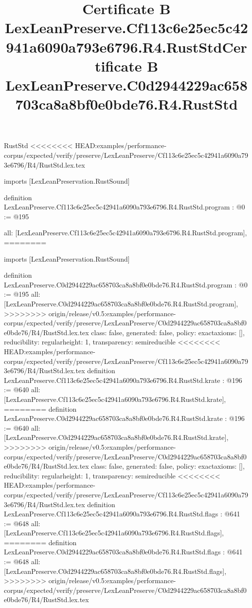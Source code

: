 \begin{lexlean}{RustStd}
<<<<<<<< HEAD:examples/performance-corpus/expected/verify/preserve/LexLeanPreserve/Cf113c6e25ec5c42941a6090a793e6796/R4/RustStd.lex.tex
\title{Certificate B LexLeanPreserve.Cf113c6e25ec5c42941a6090a793e6796.R4.RustStd}
\begin{coremodule}
imports [LexLeanPreservation.RustSound]

definition LexLeanPreserve.Cf113c6e25ec5c42941a6090a793e6796.R4.RustStd.program : @0 := @195 {
  all: [LexLeanPreserve.Cf113c6e25ec5c42941a6090a793e6796.R4.RustStd.program],
========
\title{Certificate B LexLeanPreserve.C0d2944229ac658703ca8a8bf0e0bde76.R4.RustStd}
\begin{coremodule}
imports [LexLeanPreservation.RustSound]

definition LexLeanPreserve.C0d2944229ac658703ca8a8bf0e0bde76.R4.RustStd.program : @0 := @195 {
  all: [LexLeanPreserve.C0d2944229ac658703ca8a8bf0e0bde76.R4.RustStd.program],
>>>>>>>> origin/release/v0.5:examples/performance-corpus/expected/verify/preserve/LexLeanPreserve/C0d2944229ac658703ca8a8bf0e0bde76/R4/RustStd.lex.tex
  class: false,
  generated: false,
  policy: exact{axioms: []},
  reducibility: regular{height: 1},
  transparency: semireducible
}
<<<<<<<< HEAD:examples/performance-corpus/expected/verify/preserve/LexLeanPreserve/Cf113c6e25ec5c42941a6090a793e6796/R4/RustStd.lex.tex
definition LexLeanPreserve.Cf113c6e25ec5c42941a6090a793e6796.R4.RustStd.krate : @196 := @640 {
  all: [LexLeanPreserve.Cf113c6e25ec5c42941a6090a793e6796.R4.RustStd.krate],
========
definition LexLeanPreserve.C0d2944229ac658703ca8a8bf0e0bde76.R4.RustStd.krate : @196 := @640 {
  all: [LexLeanPreserve.C0d2944229ac658703ca8a8bf0e0bde76.R4.RustStd.krate],
>>>>>>>> origin/release/v0.5:examples/performance-corpus/expected/verify/preserve/LexLeanPreserve/C0d2944229ac658703ca8a8bf0e0bde76/R4/RustStd.lex.tex
  class: false,
  generated: false,
  policy: exact{axioms: []},
  reducibility: regular{height: 1},
  transparency: semireducible
}
<<<<<<<< HEAD:examples/performance-corpus/expected/verify/preserve/LexLeanPreserve/Cf113c6e25ec5c42941a6090a793e6796/R4/RustStd.lex.tex
definition LexLeanPreserve.Cf113c6e25ec5c42941a6090a793e6796.R4.RustStd.flags : @641 := @648 {
  all: [LexLeanPreserve.Cf113c6e25ec5c42941a6090a793e6796.R4.RustStd.flags],
========
definition LexLeanPreserve.C0d2944229ac658703ca8a8bf0e0bde76.R4.RustStd.flags : @641 := @648 {
  all: [LexLeanPreserve.C0d2944229ac658703ca8a8bf0e0bde76.R4.RustStd.flags],
>>>>>>>> origin/release/v0.5:examples/performance-corpus/expected/verify/preserve/LexLeanPreserve/C0d2944229ac658703ca8a8bf0e0bde76/R4/RustStd.lex.tex
}}}
\end{coremodule}}
\end{coremodule}
\end{lexlean}
